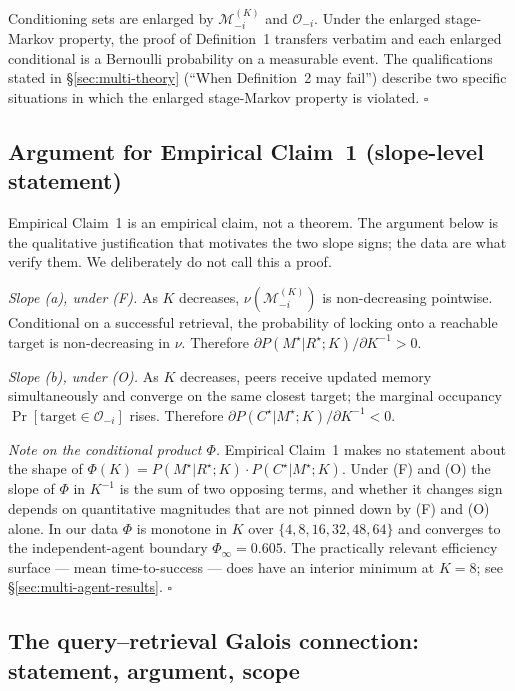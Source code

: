 \documentclass{article}
\begin{document}
Conditioning sets are enlarged by $\mathcal{M}_{-i}^{(K)}$ and $\mathcal{O}_{-i}$. Under the enlarged stage-Markov property, the proof of Definition~1 transfers verbatim and each enlarged conditional is a Bernoulli probability on a measurable event. The qualifications stated in \S\ref{sec:multi-theory} (``When Definition~2 may fail'') describe two specific situations in which the enlarged stage-Markov property is violated. \hfill$\square$

\subsection{Argument for Empirical Claim~1 (slope-level statement)}

Empirical Claim~1 is an empirical claim, not a theorem. The argument below is the qualitative justification that motivates the two slope signs; the data are what verify them. We deliberately do not call this a proof.

\emph{Slope (a), under (F).} As $K$ decreases, $\nu(\mathcal{M}_{-i}^{(K)})$ is non-decreasing pointwise. Conditional on a successful retrieval, the probability of locking onto a reachable target is non-decreasing in $\nu$. Therefore $\partial P(M^\star|R^\star;K) / \partial K^{-1} > 0$.

\emph{Slope (b), under (O).} As $K$ decreases, peers receive updated memory simultaneously and converge on the same closest target; the marginal occupancy $\Pr[\text{target}\in\mathcal{O}_{-i}]$ rises. Therefore $\partial P(C^\star|M^\star;K) / \partial K^{-1} < 0$.

\emph{Note on the conditional product $\Phi$.} Empirical Claim~1 makes no statement about the shape of $\Phi(K) = P(M^\star|R^\star;K)\!\cdot\!P(C^\star|M^\star;K)$. Under (F) and (O) the slope of $\Phi$ in $K^{-1}$ is the sum of two opposing terms, and whether it changes sign depends on quantitative magnitudes that are not pinned down by (F) and (O) alone. In our data $\Phi$ is monotone in $K$ over $\{4,8,16,32,48,64\}$ and converges to the independent-agent boundary $\Phi_\infty = 0.605$. The practically relevant efficiency surface --- mean time-to-success --- does have an interior minimum at $K=8$; see \S\ref{sec:multi-agent-results}. \hfill$\square$

\subsection{The query--retrieval Galois connection: statement, argument, scope}
\label{app:galois}
\end{document}
